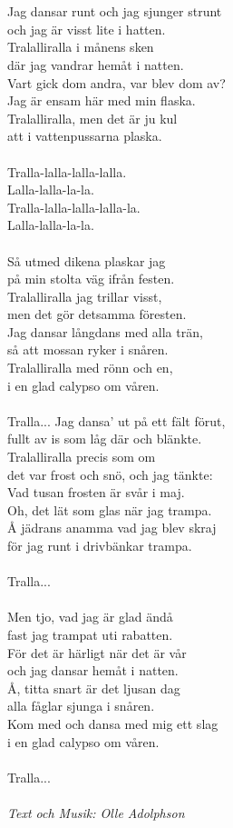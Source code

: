 \\
\vspace{10pt}\\
Jag dansar runt och jag sjunger strunt\\
och jag är visst lite i hatten.\\
Tralalliralla i månens sken\\
där jag vandrar hemåt i natten.\\
Vart gick dom andra, var blev dom av?\\
Jag är ensam här med min flaska.\\
Tralalliralla, men det är ju kul\\
att i vattenpussarna plaska.\\
\\
Tralla-lalla-lalla-lalla.\\
Lalla-lalla-la-la.\\
Tralla-lalla-lalla-lalla-la.\\
Lalla-lalla-la-la.\\
\\
Så utmed dikena plaskar jag\\
på min stolta väg ifrån festen.\\
Tralalliralla jag trillar visst,\\
men det gör detsamma föresten.\\
Jag dansar långdans med alla trän,\\
så att mossan ryker i snåren.\\
Tralalliralla med rönn och en,\\
i en glad calypso om våren.\\
\\
Tralla...
\newpage
Jag dansa' ut på ett fält förut,\\
fullt av is som låg där och blänkte.\\
Tralalliralla precis som om\\
det var frost och snö, och jag tänkte:\\
Vad tusan frosten är svår i maj.\\
Oh, det lät som glas när jag trampa.\\
Å jädrans anamma vad jag blev skraj\\
för jag runt i drivbänkar trampa.\\
\\
Tralla...\\
\\
Men tjo, vad jag är glad ändå\\
fast jag trampat uti rabatten.\\
För det är härligt när det är vår\\
och jag dansar hemåt i natten.\\
Å, titta snart är det ljusan dag\\
alla fåglar sjunga i snåren.\\
Kom med och dansa med mig ett slag\\
i en glad calypso om våren.\\
\\
Tralla...\\
\\
{\footnotesize\textit{Text och Musik: Olle Adolphson}}
